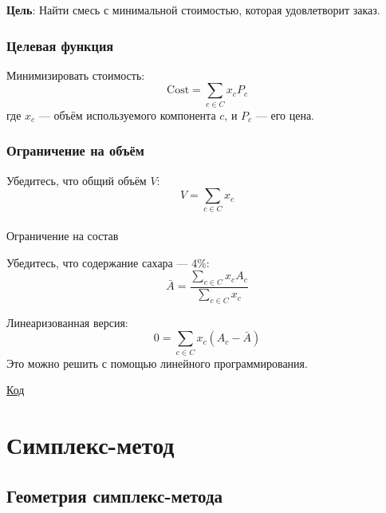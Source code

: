\documentclass[
  russian,
  letterpaper,
  DIV=11,
  numbers=noendperiod]{scrartcl}
\makeatletter
\let\oldparagraph\paragraph
\renewcommand{\paragraph}{
    \@ifstar
      \xxxParagraphStar
      \xxxParagraphNoStar
  }
\newcommand{\xxxParagraphStar}[1]{\oldparagraph*{#1}\mbox{}}
\newcommand{\xxxParagraphNoStar}[1]{\oldparagraph{#1}\mbox{}}
\makeatother
\begin{document}
\textbf{Цель}: Найти смесь с минимальной стоимостью, которая
удовлетворит заказ.

\subsubsection{Целевая
функция}\label{ux446ux435ux43bux435ux432ux430ux44f-ux444ux443ux43dux43aux446ux438ux44f}

Минимизировать стоимость: \[
\text{Cost} = \sum_{c \in C} x_c P_c
\] где \(x_c\) --- объём используемого компонента \(c\), и \(P_c\) ---
его цена.

\subsubsection{Ограничение на
объём}\label{ux43eux433ux440ux430ux43dux438ux447ux435ux43dux438ux435-ux43dux430-ux43eux431ux44aux451ux43c}

Убедитесь, что общий объём \(V\): \[
V = \sum_{c \in C} x_c
\]

\paragraph{Ограничение на
состав}\label{ux43eux433ux440ux430ux43dux438ux447ux435ux43dux438ux435-ux43dux430-ux441ux43eux441ux442ux430ux432}

Убедитесь, что содержание сахара --- 4\%: \[
\bar{A} = \frac{\sum_{c \in C} x_c A_c}{\sum_{c \in C} x_c}
\]

Линеаризованная версия: \[
0 = \sum_{c \in C} x_c (A_c - \bar{A})
\] Это можно решить с помощью линейного программирования.

\href{https://colab.research.google.com/github/MerkulovDaniil/optim/blob/master/assets/Notebooks/LP_blending.ipynb}{\faPython Код}

\section{Симплекс-метод}\label{ux441ux438ux43cux43fux43bux435ux43aux441-ux43cux435ux442ux43eux434}

\subsection{Геометрия
симплекс-метода}\label{ux433ux435ux43eux43cux435ux442ux440ux438ux44f-ux441ux438ux43cux43fux43bux435ux43aux441-ux43cux435ux442ux43eux434ux430}
\end{document}
